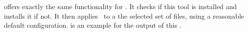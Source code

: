 offers exactly the same functionality for \pylint.
It checks if this tool is installed and installs it if not.
It then applies \pylint\ to a the selected set of files, using a reasonable default configuration.
 is an example for the output of this .%
%
\endhsection%
%

